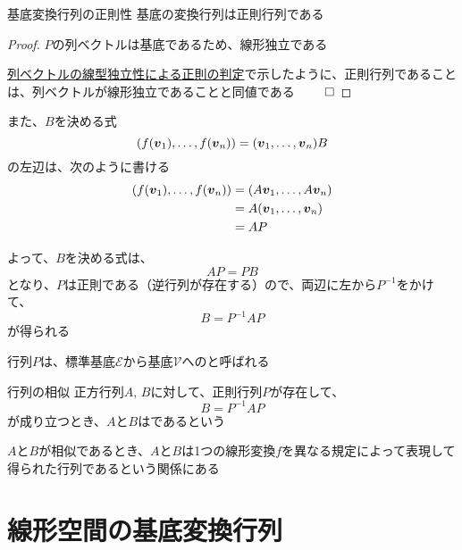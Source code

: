 \documentclass[../../../topic_linear-algebra]{subfiles}
\begin{document}
\begin{theorem}{基底変換行列の正則性}
  基底の変換行列は正則行列である
\end{theorem}

\begin{proof}
  $P$の列ベクトルは基底であるため、線形独立である

  \hyperref[thm:invertible-iff-col-indep]{列ベクトルの線型独立性による正則の判定}で示したように、正則行列であることは、列ベクトルが線形独立であることと同値である $\qed$
\end{proof}

また、$B$を決める式
\begin{equation*}
  (f(\vb*{v}_1), \ldots, f(\vb*{v}_n)) = (\vb*{v}_1, \ldots, \vb*{v}_n) B
\end{equation*}
の左辺は、次のように書ける
\begin{align*}
  (f(\vb*{v}_1), \ldots, f(\vb*{v}_n)) & = (A\vb*{v}_1, \ldots, A\vb*{v}_n) \\
                                       & = A (\vb*{v}_1, \ldots, \vb*{v}_n) \\
                                       & = A P
\end{align*}

よって、$B$を決める式は、
\begin{equation*}
  AP = PB
\end{equation*}
となり、$P$は正則である（逆行列が存在する）ので、両辺に左から$P^{-1}$をかけて、
\begin{equation*}
  B = P^{-1} A P
\end{equation*}
が得られる

\br

行列$P$は、標準基底$\mathcal{E}$から基底$\mathcal{V}$へのと呼ばれる

\sectionline

\begin{definition}{行列の相似}
  正方行列$A,\,B$に対して、正則行列$P$が存在して、
  \begin{equation*}
    B = P^{-1} A P
  \end{equation*}
  が成り立つとき、$A$と$B$はであるという
\end{definition}

$A$と$B$が相似であるとき、$A$と$B$は1つの線形変換$f$を異なる規定によって表現して得られた行列であるという関係にある

\sectionline
\section{線形空間の基底変換行列}
\end{document}
